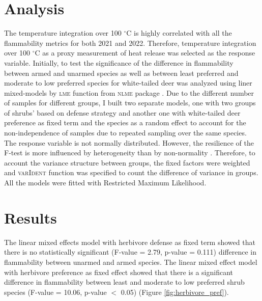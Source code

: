 \documentclass{ttuthes2007}
\newcommand{\pkg}[1]{\textsc{#1}}
\begin{document}
\section{Analysis}
The temperature integration over 100 $^{\circ}$C is highly correlated with all the flammability metrics %
for both 2021 and 2022. Therefore, temperature integration over 100 $^{\circ}$C as a proxy measurement of heat release was selected as the response variable. Initially, to test the significance of the difference in flammability between armed and unarmed species as well as between least preferred and moderate to low preferred species for white-tailed deer was analyzed using liner mixed-models by \pkg{lme} function from \pkg{nlme} package \citep{pinheiro2017package}. Due to the different number of samples for different groups, I  built two separate models, one with two groups of shrubs' based on defense strategy and another one with white-tailed deer preference as fixed term and the species as a random effect to account for the non-independence of samples due to repeated sampling over the same species. The response variable is not normally distributed. However, the resilience of the F-test is more influenced by heterogeneity than by non-normality \citep{blanca2017non}. Therefore, to account the variance structure between groups, the fixed factors were weighted and \pkg{varIdent} function was specified to count the difference of variance in groups. All the models were fitted with Restricted Maximum Likelihood. 


\section{Results}

The linear mixed effects model with herbivore defense as fixed term showed that there is no statistically significant (F-value = 2.79, p-value = 0.111) difference in flammability between unarmed and armed species. %
The linear mixed effect model with herbivore preference as fixed effect showed that there is a significant difference in flammability between least and moderate to low preferred shrub species (F-value = 10.06, p-value $<$ 0.05)
(Figure \ref{fig:herbivore_pref}). 
\end{document}
